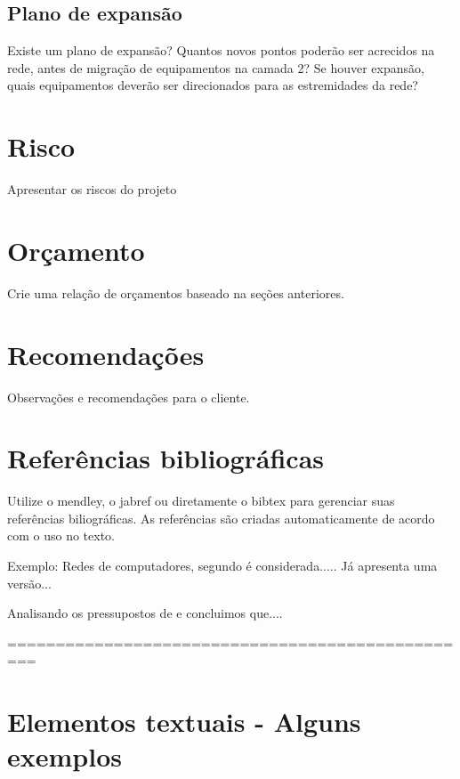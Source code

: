 \documentclass[	DIV=calc,%
							paper=a4,%
							fontsize=12pt,%
							onecolumn]{scrartcl}	 					%
\begin{document}
\subsection{Plano de expansão}
Existe um plano de expansão? Quantos novos pontos poderão ser acrecidos na rede, antes de migração de equipamentos na camada 2? Se houver expansão, quais equipamentos deverão ser direcionados para as estremidades da rede? 

\section{Risco}
Apresentar os riscos do projeto

\section{Orçamento}
Crie uma relação de orçamentos baseado na seções anteriores.

\section{Recomendações}
Observações e recomendações para o cliente.

\section{Referências bibliográficas}
Utilize o mendley, o jabref ou diretamente o bibtex para gerenciar suas referências biliográficas. As referências são criadas automaticamente de acordo com o uso no texto.

Exemplo: Redes de computadores, segundo \cite{t2013} é considerada..... Já \cite{kurose2010} apresenta uma versão...

Analisando os pressupostos de \cite{ref3} e \cite{ref4} concluimos que....


\renewcommand\refname{} %

  

=================================================
\section{Elementos textuais - Alguns exemplos}
\end{document}
